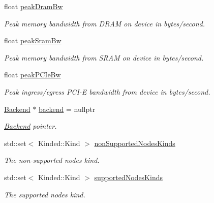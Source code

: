 \begin{DoxyCompactItemize}
float \hyperlink{structglow_1_1_backend_info_a882516a34d2a6aaf02235510f2d76203}{peak\+Dram\+Bw}
\begin{DoxyCompactList}\small\item\em Peak memory bandwidth from D\+R\+AM on device in bytes/second. \end{DoxyCompactList}\item 
\mbox{\label{structglow_1_1_backend_info_adc88763f2bfc246eba21cbf7f15b9db7}} 
float \hyperlink{structglow_1_1_backend_info_adc88763f2bfc246eba21cbf7f15b9db7}{peak\+Sram\+Bw}
\begin{DoxyCompactList}\small\item\em Peak memory bandwidth from S\+R\+AM on device in bytes/second. \end{DoxyCompactList}\item 
\mbox{\label{structglow_1_1_backend_info_a0a307c40f316abe2827e7e7d6d0e6db8}} 
float \hyperlink{structglow_1_1_backend_info_a0a307c40f316abe2827e7e7d6d0e6db8}{peak\+P\+C\+Ie\+Bw}
\begin{DoxyCompactList}\small\item\em Peak ingress/egress P\+C\+I-\/E bandwidth from device in bytes/second. \end{DoxyCompactList}\item 
\mbox{\label{structglow_1_1_backend_info_aa86bd2f0dc9cbb259b3d76ed3fced1b0}} 
\hyperlink{classglow_1_1_backend}{Backend} $\ast$ \hyperlink{structglow_1_1_backend_info_aa86bd2f0dc9cbb259b3d76ed3fced1b0}{backend} = nullptr
\begin{DoxyCompactList}\small\item\em \hyperlink{classglow_1_1_backend}{Backend} pointer. \end{DoxyCompactList}\item 
\mbox{\label{structglow_1_1_backend_info_abd15c9aa860f0dabe22409f1302b9a9a}} 
std\+::set$<$ Kinded\+::\+Kind $>$ \hyperlink{structglow_1_1_backend_info_abd15c9aa860f0dabe22409f1302b9a9a}{non\+Supported\+Nodes\+Kinds}
\begin{DoxyCompactList}\small\item\em The non-\/supported nodes kind. \end{DoxyCompactList}\item 
\mbox{\label{structglow_1_1_backend_info_a7b8f3298e4d76bb23e57b456c94900e1}} 
std\+::set$<$ Kinded\+::\+Kind $>$ \hyperlink{structglow_1_1_backend_info_a7b8f3298e4d76bb23e57b456c94900e1}{supported\+Nodes\+Kinds}
\begin{DoxyCompactList}\small\item\em The supported nodes kind. \end{DoxyCompactList}\end{DoxyCompactItemize}


